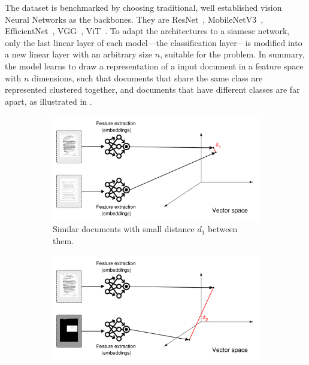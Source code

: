 The dataset is benchmarked by choosing traditional, well established vision Neural Networks as the backbones. They are ResNet~\cite{he_deep_2016}, MobileNetV3~\cite{howard_searching_2019}, EfficientNet~\cite{tan_efficientnet_2019}, VGG~\cite{simonyan_very_2015}, \gls{ViT}~\cite{dosovitskiy_image_2021}. To adapt the architectures to a siamese network, only the last linear layer of each model---the classification layer---is modified into a new linear layer with an arbitrary size $n$, suitable for the problem. In summary, the model learns to draw a representation of a input document in a feature space with $n$ dimensions, such that documents that share the same class are represented clustered together, and documents that have different classes are far apart, as illustrated in .

\begin{figure}[ht!]
    \begin{subfigure}[b]{0.99\textwidth}
        \centering
        \includegraphics[width=\textwidth, trim=15 0 30 0, clip]{images/vector_space_1.pdf}
        \caption{Similar documents with small distance $d_1$ between them.}
        \label{fig:similar_docs}
    \end{subfigure}
    \vfill
    \begin{subfigure}[b]{0.99\textwidth}
        \centering
        \includegraphics[width=\textwidth, trim=15 0 30 0, clip]{images/vector_space_2.pdf}

\end{subfigure}
\end{figure}
